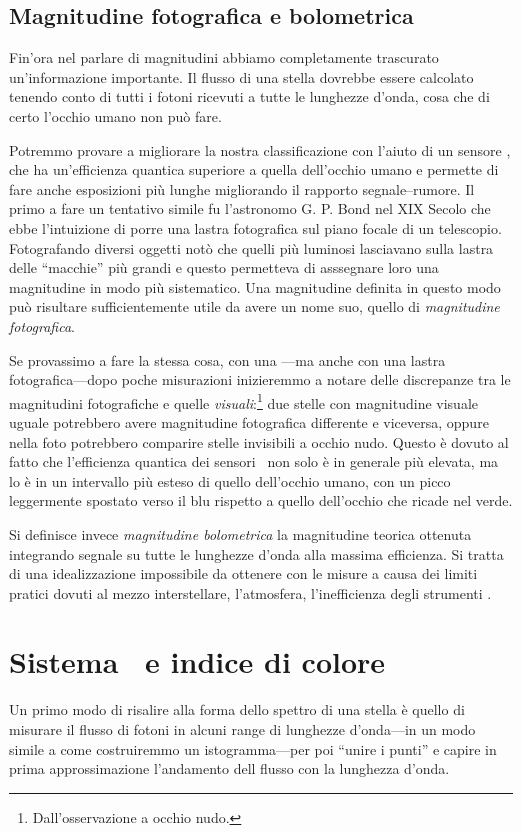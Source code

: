     \subsection{Magnitudine fotografica e bolometrica}
        Fin'ora nel parlare di magnitudini abbiamo completamente trascurato un'informazione importante. Il flusso di una stella dovrebbe essere calcolato tenendo conto di tutti i fotoni ricevuti a tutte le lunghezze d'onda, cosa che di certo l'occhio umano non può fare.
        
        Potremmo provare a migliorare la nostra classificazione con l'aiuto di un sensore \ccd, che ha un'efficienza quantica superiore a quella dell'occhio umano e permette di fare anche esposizioni più lunghe migliorando il rapporto segnale--rumore. Il primo a fare un tentativo simile fu l'astronomo G. P. Bond nel XIX Secolo che ebbe l'intuizione di porre una lastra fotografica sul piano focale di un telescopio. Fotografando diversi oggetti notò che quelli più luminosi lasciavano sulla lastra delle ``macchie'' più grandi e questo permetteva di asssegnare loro una magnitudine in modo più sistematico. Una magnitudine definita in questo modo può risultare sufficientemente utile da avere un nome suo, quello di \emph{magnitudine fotografica}.

        Se provassimo a fare la stessa cosa, con una \ccd---ma anche con una lastra fotografica---dopo poche misurazioni inizieremmo a notare delle discrepanze tra le magnitudini fotografiche e quelle \emph{visuali}:\footnote{Dall'osservazione a occhio nudo.} due stelle con magnitudine visuale uguale potrebbero avere magnitudine fotografica differente e viceversa, oppure nella foto potrebbero comparire stelle invisibili a occhio nudo. Questo è dovuto al fatto che l'efficienza quantica dei sensori \ccd\ non solo è in generale più elevata, ma lo è in un intervallo più esteso di quello dell'occhio umano, con un picco leggermente spostato verso il blu rispetto a quello dell'occhio che ricade nel verde.

        Si definisce invece \emph{magnitudine bolometrica} la magnitudine teorica ottenuta integrando segnale su tutte le lunghezze d'onda alla massima efficienza. Si tratta di una idealizzazione impossibile da ottenere con le misure a causa dei limiti pratici dovuti al mezzo interstellare, l'atmosfera, l'inefficienza degli strumenti \myetc.
\section{Sistema \ubvri\ e indice di colore}
    Un primo modo di risalire alla forma dello spettro di una stella è quello di misurare il flusso di fotoni in alcuni range di lunghezze d'onda---in un modo simile a come costruiremmo un istogramma---per poi ``unire i punti'' e capire in prima approssimazione l'andamento dell flusso con la lunghezza d'onda.
